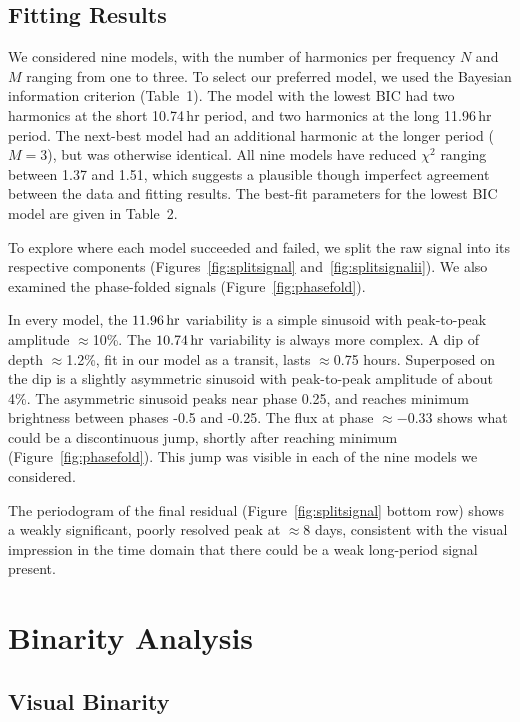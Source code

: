 \documentclass[12pt,twocolumn,tighten]{aastex62}
\begin{document}
\subsection{Fitting Results}

We considered nine models, with the number of harmonics per frequency
$N$ and $M$ ranging from one to three.  To select our preferred model,
we used the Bayesian information criterion (Table~1).  The model with
the lowest BIC had two harmonics at the short 10.74$\,$hr period, and
two harmonics at the long 11.96$\,$hr period.  The next-best model had
an additional harmonic at the longer period ($M=3$), but was otherwise
identical.  All nine models have reduced $\chi^2$ ranging between 1.37
and 1.51, which suggests a plausible though imperfect agreement
between the data and fitting results.  The best-fit parameters for the
lowest BIC model are given in Table~2.

To explore where each model succeeded and failed, we split the raw
signal into its respective components (Figures~\ref{fig:splitsignal}
and~\ref{fig:splitsignalii}).  We also examined the phase-folded
signals (Figure~\ref{fig:phasefold}).  

In every model, the $11.96\,{\rm hr}$ variability is a simple sinusoid
with peak-to-peak amplitude $\approx$10\%.  The $10.74\,{\rm hr}$
variability is always more complex.  A dip of depth $\approx$1.2\%,
fit in our model as a transit, lasts $\approx$0.75 hours.  Superposed
on the dip is a slightly asymmetric sinusoid with peak-to-peak
amplitude of about 4\%. The asymmetric sinusoid peaks near phase 0.25,
and reaches minimum brightness between phases -0.5 and -0.25.  The
flux at phase $\approx -0.33$ shows what could be a discontinuous
jump, shortly after reaching minimum (Figure~\ref{fig:phasefold}).
This jump was visible in each of the nine models we considered.

The periodogram of the final residual (Figure~\ref{fig:splitsignal}
bottom row) shows a weakly significant, poorly resolved peak at
$\approx$8 days, consistent with the visual impression in the time
domain that there could be a weak long-period signal present.



\section{Binarity Analysis}
\label{sec:gaia}

\subsection{Visual Binarity}
\label{subsec:blend}
\end{document}
